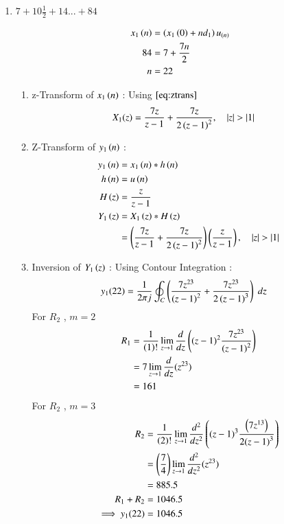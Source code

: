 \documentclass[journal,12pt,onecolumn]{IEEEtran}
\theoremstyle{remark}
\begin{document}
\begin{enumerate}
\item
$ 7 + 10\frac{1}{2} + 14 ... + 84$
\vspace{0.5cm}

\begin{align}
x_1\left(n\right) &= \left(x_1\left(0\right) + nd_1\right)u_{\left(n\right)}\\
84 &= 7+\frac{7n}{2}\\
n &= 22
\end{align}

\begin{enumerate}    
\item 
z-Transform of $x_1\left(n\right)$ :
Using $\eqref{eq:ztrans}$
\begin{align}
X_1(z)&= \frac{7z}{z-1} + \frac{7z}{{2\left(z-1\right)}^{2}} \label{eq:ee25-4}
,\quad \left\vert z\right\vert>\left\vert1\right\vert 
\end{align}
\item
Z-Transform of $y_1\left(n\right)$ :
\begin{align}
    y_1\left(n\right) &= x_1\left(n\right) * h\left(n\right) \\
         h\left(n\right) &= u\left(n\right) \\
                 H\left(z\right) &= \frac{z}{z-1} \label{eq:ee25-9}\\
    Y_1\left(z\right) &= X_1\left(z\right) * H\left(z\right)\\
 &= \left(\frac{7z}{z-1}+
\frac{7z}{2\left(z-1\right)^{2}}\right)\left(\frac{z}{z-1}\right)
,\quad \left\vert z\right\vert>\left\vert1\right\vert     
\end{align}
        \item
Inversion of $Y_1\left(z\right)$ :
Using Contour Integration :
\begin{align}
    y_1{(22)}&=\frac{1}{2\pi j}\oint_{C}\left(\frac{7z^{23}}{\left(z-1\right)^2}+
       \frac{7z^{23}}{2\left(z-1\right)^3}\right) \;dz 
\end{align}
    For $R_2$ , $m=2$ 
\begin{align}
  R_1 &=\frac{1}{\left(1\right)!}\lim\limits_{z\to 1}\frac{d}{dz}\left({(z-1)}^{2}\frac{7z^{23}}{{(z-1)}^2}\right)   \\
    &=7\lim\limits_{z\to 1}\frac{d}{dz}(z^{23})   \\
    &= 161
    \end{align}
    For $R_2$ , $m=3$ 
    \begin{align}
    R_2 &=\frac{1}{\left(2\right)!}\lim\limits_{z\to 1}\frac{d^{2}}{dz^{2}}\left({(z-1)}^{3}\frac{\left(7z^{13}\right)}{{2(z-1)}^3}\right)   \\
    &=\left(\frac{7}{4}\right)\lim\limits_{z\to 1}\frac{d^2}{dz^2}(z^{23})   \\
    &= 885.5\\
    R_1 + R_2 &= 1046.5\\
    \implies  y_1{(22)} &= 1046.5
\end{align}
\end{enumerate}   


\end{enumerate}
\end{document}
